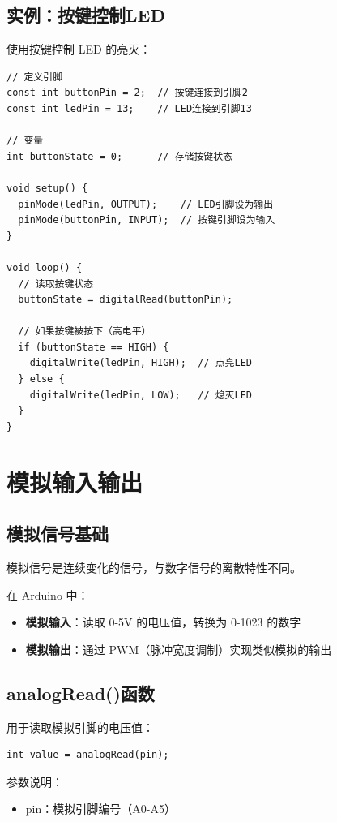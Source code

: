\documentclass[12pt,UTF8]{ctexbook}
\begin{document}
\section{实例：按键控制LED}

使用按键控制 LED 的亮灭：

\begin{lstlisting}
// 定义引脚
const int buttonPin = 2;  // 按键连接到引脚2
const int ledPin = 13;    // LED连接到引脚13

// 变量
int buttonState = 0;      // 存储按键状态

void setup() {
  pinMode(ledPin, OUTPUT);    // LED引脚设为输出
  pinMode(buttonPin, INPUT);  // 按键引脚设为输入
}

void loop() {
  // 读取按键状态
  buttonState = digitalRead(buttonPin);
  
  // 如果按键被按下（高电平）
  if (buttonState == HIGH) {
    digitalWrite(ledPin, HIGH);  // 点亮LED
  } else {
    digitalWrite(ledPin, LOW);   // 熄灭LED
  }
}
\end{lstlisting}

\chapter{模拟输入输出}

\section{模拟信号基础}

模拟信号是连续变化的信号，与数字信号的离散特性不同。

在 Arduino 中：
\begin{itemize}
    \item \textbf{模拟输入}：读取 0-5V 的电压值，转换为 0-1023 的数字
    \item \textbf{模拟输出}：通过 PWM（脉冲宽度调制）实现类似模拟的输出
\end{itemize}

\section{analogRead()函数}

用于读取模拟引脚的电压值：

\begin{lstlisting}
int value = analogRead(pin);
\end{lstlisting}

参数说明：
\begin{itemize}
    \item pin：模拟引脚编号（A0-A5）
\end{itemize}
\end{document}
